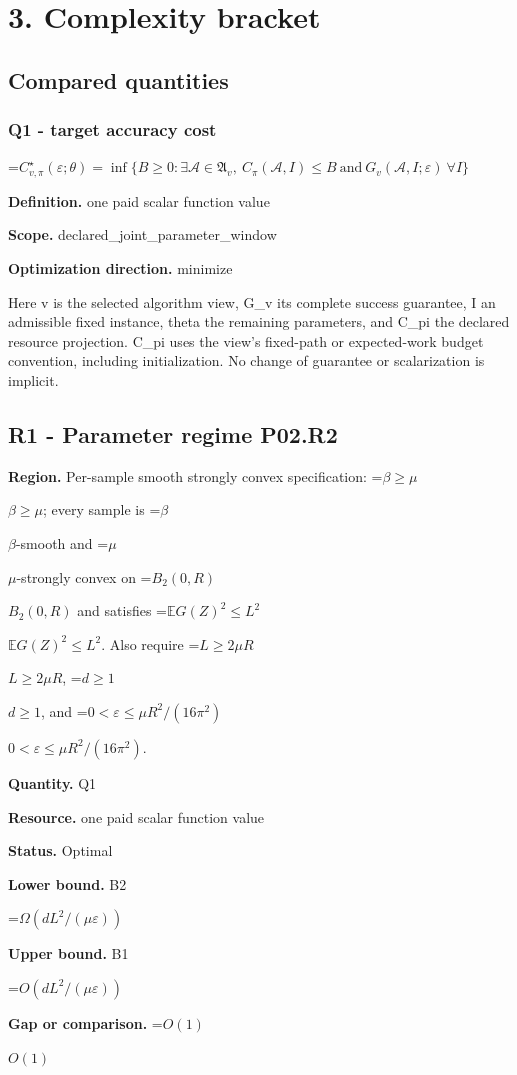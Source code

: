 \documentclass[10pt,a4paper]{article}
\newcommand{\AtlasMath}[1]{\par\begingroup\centering\setbox0=\hbox{$\displaystyle #1$}\ifdim\wd0>1.4\linewidth\typeout{ATLAS WIDE FORMULA: \the\wd0}\fi\ifdim\wd0>\linewidth\resizebox{\linewidth}{!}{\box0}\else\box0\fi\par\endgroup}
\newcommand{\AtlasInlineMath}[1]{\begingroup\setbox0=\hbox{$#1$}\ifdim\wd0>.4\linewidth\endgroup\AtlasMath{#1}\else\endgroup$#1$\fi}
\begin{document}
\section{3. Complexity bracket}
\subsection{Compared quantities}
\subsubsection{Q1 - target accuracy cost}
\AtlasMath{C^\star_{v,\pi}(\varepsilon;\theta)=\inf\{B\ge0:\exists\mathcal A\in\mathfrak A_v,\ C_\pi(\mathcal A,I)\le B\ \text{and}\ G_v(\mathcal A,I;\varepsilon)\ \forall I\}}
\textbf{Definition.} one paid scalar function value

\textbf{Scope.} declared\_joint\_parameter\_window

\textbf{Optimization direction.} minimize

Here v is the selected algorithm view, G\_v its complete success guarantee, I an admissible fixed instance, theta the remaining parameters, and C\_pi the declared resource projection. C\_pi uses the view's fixed-path or expected-work budget convention, including initialization. No change of guarantee or scalarization is implicit.

\subsection{R1 - Parameter regime P02.R2}
\textbf{Region.} Per-sample smooth strongly convex specification: \AtlasInlineMath{\beta\ge\mu}; every sample is \AtlasInlineMath{\beta}-smooth and \AtlasInlineMath{\mu}-strongly convex on \AtlasInlineMath{B_2(0,R)} and satisfies \AtlasInlineMath{\mathbb{E}G(Z)^2\le L^2}. Also require \AtlasInlineMath{L\ge2\mu R}, \AtlasInlineMath{d\ge1}, and \AtlasInlineMath{0<\varepsilon\le\mu R^2/(16\pi^2)}.

\textbf{Quantity.} Q1

\textbf{Resource.} one paid scalar function value

\textbf{Status.} Optimal

\textbf{Lower bound.} B2

\AtlasMath{\Omega(dL^2/(\mu\varepsilon))}
\textbf{Upper bound.} B1

\AtlasMath{O(dL^2/(\mu\varepsilon))}
\textbf{Gap or comparison.} \AtlasInlineMath{O(1)}
\end{document}
